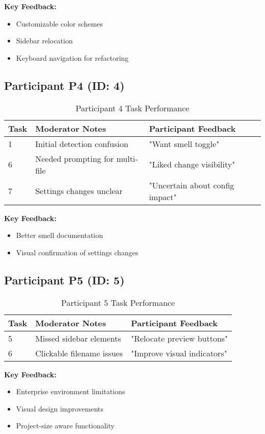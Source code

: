 \documentclass{article}
\begin{document}
\textbf{Key Feedback:}
\begin{itemize}
\item Customizable color schemes
\item Sidebar relocation
\item Keyboard navigation for refactoring
\end{itemize}

\subsection{Participant P4 (ID: 4)}
\begin{table}[H]
\centering
\caption{Participant 4 Task Performance}
\begin{tabular}{|l|p{4cm}|p{4cm}|}
\hline
\textbf{Task} & \textbf{Moderator Notes} & \textbf{Participant Feedback} \\ \hline
1 & Initial detection confusion & "Want smell toggle" \\ \hline
6 & Needed prompting for multi-file & "Liked change visibility" \\ \hline
7 & Settings changes unclear & "Uncertain about config impact" \\ \hline
\end{tabular}
\end{table}

\textbf{Key Feedback:}
\begin{itemize}
\item Better smell documentation
\item Visual confirmation of settings changes
\end{itemize}

\subsection{Participant P5 (ID: 5)}
\begin{table}[H]
\centering
\caption{Participant 5 Task Performance}
\begin{tabular}{|l|p{4cm}|p{4cm}|}
\hline
\textbf{Task} & \textbf{Moderator Notes} & \textbf{Participant Feedback} \\ \hline
5 & Missed sidebar elements & "Relocate preview buttons" \\ \hline
6 & Clickable filename issues & "Improve visual indicators" \\ \hline
\end{tabular}
\end{table}

\textbf{Key Feedback:}
\begin{itemize}
\item Enterprise environment limitations
\item Visual design improvements
\item Project-size aware functionality
\end{itemize}
\end{document}
